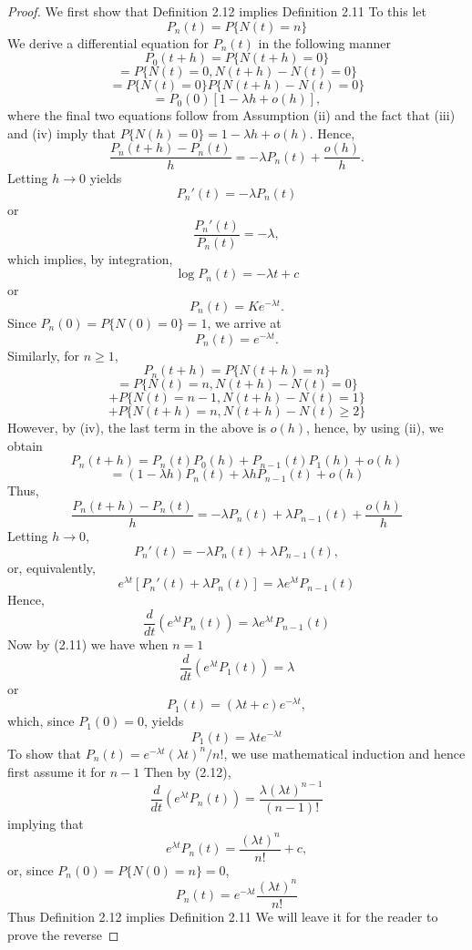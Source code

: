 \documentclass[lang=cn,10pt,thmcnt=section]{elegantbook}
\begin{document}
\begin{proof}
	We first show that Definition 2.12 implies Definition 2.11 To this let 
\[ P_n(t) = P\{N(t) = n\} \]
We derive a differential equation for $P_n(t)$ in the following manner
\[ P_0(t+h) = P\{N(t+h) = 0\} \]
\[ = P\{N(t) = 0, N(t+h) - N(t) = 0\} \]
\[ = P\{N(t) = 0\}P\{N(t+h) - N(t) = 0\} \]
\[ = P_0(0)[1 - \lambda h + o(h)], \]
where the final two equations follow from Assumption (ii) and the fact that (iii) and (iv) imply that $P\{N(h) = 0\} = 1 - \lambda h + o(h)$. Hence,
\[ \frac{P_n(t+h) - P_n(t)}{h} = -\lambda P_n(t) + \frac{o(h)}{h}. \]
Letting $h \to 0$ yields
\[ P_n'(t) = -\lambda P_n(t) \]
or
\[ \frac{P_n'(t)}{P_n(t)} = -\lambda, \]
which implies, by integration,
\[ \log P_n(t) = -\lambda t + c \]
or
\[ P_n(t) = Ke^{-\lambda t}. \]
Since $P_n(0) = P\{N(0) = 0\} = 1$, we arrive at
\begin{equation}
P_n(t) = e^{-\lambda t}.
\end{equation}
Similarly, for $n \geq 1$,
\[ P_n(t+h) = P\{N(t+h) = n\} \]
\[ = P\{N(t) = n, N(t+h) - N(t) = 0\} \]
\[ + P\{N(t) = n-1, N(t+h) - N(t) = 1\} \]
\[ + P\{N(t+h) = n, N(t+h) - N(t) \geq 2\} \]
However, by (iv), the last term in the above is $o(h)$, hence, by using (ii), we obtain
\[ P_n(t+h) = P_n(t)P_0(h) + P_{n-1}(t)P_1(h) + o(h) \]
\[ = (1 - \lambda h)P_n(t) + \lambda h P_{n-1}(t) + o(h) \]
Thus,
\[ \frac{P_n(t+h) - P_n(t)}{h} = -\lambda P_n(t) + \lambda P_{n-1}(t) + \frac{o(h)}{h} \]
Letting $h \to 0$,
\[ P_n'(t) = -\lambda P_n(t) + \lambda P_{n-1}(t), \]
or, equivalently,
\[ e^{\lambda t}[P_n'(t) + \lambda P_n(t)] = \lambda e^{\lambda t} P_{n-1}(t) \]
Hence,
\begin{equation}
\frac{d}{dt}(e^{\lambda t} P_n(t)) = \lambda e^{\lambda t} P_{n-1}(t)
\end{equation}
Now by (2.11) we have when $n = 1$
\[ \frac{d}{dt}(e^{\lambda t} P_1(t)) = \lambda \]
or
\[ P_1(t) = (\lambda t + c)e^{-\lambda t}, \]
which, since $P_1(0) = 0$, yields
\[ P_1(t) = \lambda te^{-\lambda t} \]
To show that $P_n(t) = e^{-\lambda t}(\lambda t)^n/n!$, we use mathematical induction and hence first assume it for $n - 1$ Then by (2.12),
\[ \frac{d}{dt}(e^{\lambda t} P_n(t)) = \frac{\lambda (\lambda t)^{n-1}}{(n-1)!} \]
implying that
\[ e^{\lambda t} P_n(t) = \frac{(\lambda t)^n}{n!} + c, \]
or, since $P_n(0) = P\{N(0) = n\} = 0$,
\[ P_n(t) = e^{-\lambda t} \frac{(\lambda t)^n}{n!} \]
Thus Definition 2.12 implies Definition 2.11 We will leave it for the reader to prove the reverse

\end{proof}
\end{document}
